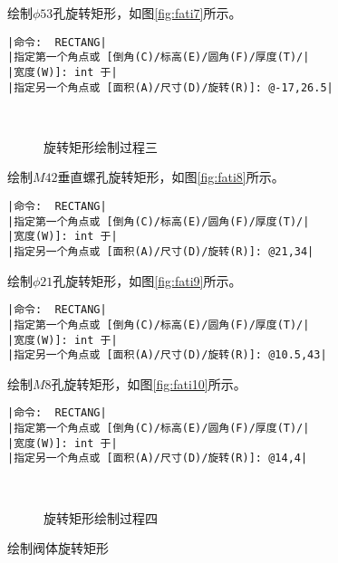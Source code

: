 \begin{procedure}
\begin{lstlisting}
\end{lstlisting}
绘制$\phi 53$孔旋转矩形，如图\ref{fig:fati7}所示。
\begin{lstlisting}
|命令:  RECTANG|
|指定第一个角点或 [倒角(C)/标高(E)/圆角(F)/厚度(T)/|
|宽度(W)]: int 于|
|指定另一个角点或 [面积(A)/尺寸(D)/旋转(R)]: @-17,26.5|
\end{lstlisting}
\begin{figure}[htbp]
\centering
{}\hspace{30pt}
\\
\hspace{30pt}
\caption{旋转矩形绘制过程三}
\end{figure}
绘制$M42$垂直螺孔旋转矩形，如图\ref{fig:fati8}所示。
\begin{lstlisting}
|命令:  RECTANG|
|指定第一个角点或 [倒角(C)/标高(E)/圆角(F)/厚度(T)/|
|宽度(W)]: int 于|
|指定另一个角点或 [面积(A)/尺寸(D)/旋转(R)]: @21,34|
\end{lstlisting}
绘制$\phi 21$孔旋转矩形，如图\ref{fig:fati9}所示。
\begin{lstlisting}
|命令:  RECTANG|
|指定第一个角点或 [倒角(C)/标高(E)/圆角(F)/厚度(T)/|
|宽度(W)]: int 于|
|指定另一个角点或 [面积(A)/尺寸(D)/旋转(R)]: @10.5,43|
\end{lstlisting}
绘制$M8$孔旋转矩形，如图\ref{fig:fati10}所示。
\begin{lstlisting}
|命令:  RECTANG|
|指定第一个角点或 [倒角(C)/标高(E)/圆角(F)/厚度(T)/|
|宽度(W)]: int 于|
|指定另一个角点或 [面积(A)/尺寸(D)/旋转(R)]: @14,4|
\end{lstlisting}
\begin{figure}[htbp]
\centering
{}\hspace{30pt}
\\
\hspace{30pt}
\caption{旋转矩形绘制过程四}
\end{figure}
\item 绘制阀体旋转矩形


\end{procedure}
